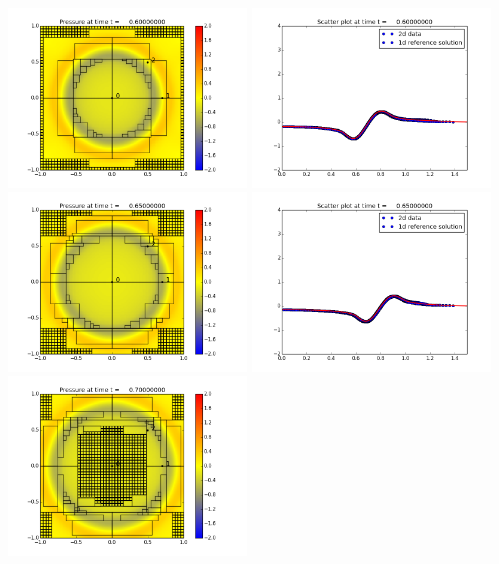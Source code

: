 \documentclass[11pt]{article}
\begin{document}
\vskip 10pt 
\includegraphics[width=0.475\textwidth]{frame0012fig0.png}
\includegraphics[width=0.475\textwidth]{frame0012fig3.png}
\vskip 10pt 
\includegraphics[width=0.475\textwidth]{frame0013fig0.png}
\includegraphics[width=0.475\textwidth]{frame0013fig3.png}
\vskip 10pt 
\includegraphics[width=0.475\textwidth]{frame0014fig0.png}
\end{document}
